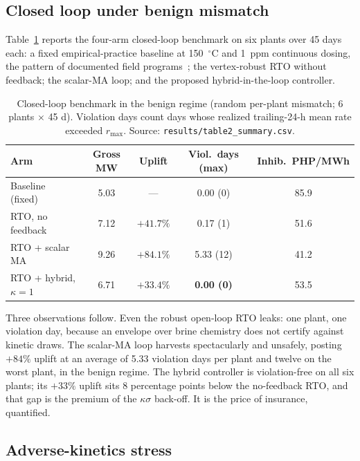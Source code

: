 \subsection{Closed loop under benign mismatch}\label{sec:table2}

Table~\ref{tab:control} reports the four-arm closed-loop benchmark on
six plants over 45 days each: a fixed empirical-practice baseline at
150~$^{\circ}$C and 1~ppm continuous dosing, the pattern of documented
field programs~\citep{baltazar2014grc}; the vertex-robust RTO without
feedback; the scalar-MA loop; and the proposed hybrid-in-the-loop
controller.
\begin{table}[t]\centering
\caption{Closed-loop benchmark in the benign regime (random per-plant
mismatch; 6 plants $\times$ 45 d). Violation days count days whose
realized trailing-24-h mean rate exceeded $r_{\max}$.
Source: \texttt{results/table2\_summary.csv}.}
\label{tab:control}
\begin{tabular}{lcccc}
\toprule
Arm & Gross MW & Uplift & Viol.\ days (max) & Inhib.\ PHP/MWh \\
\midrule
Baseline (fixed) & 5.03 & --- & 0.00 (0) & 85.9 \\
RTO, no feedback & 7.12 & $+41.7\%$ & 0.17 (1) & 51.6 \\
RTO + scalar MA & 9.26 & $+84.1\%$ & 5.33 (12) & 41.2 \\
RTO + hybrid, $\kappa{=}1$ & 6.71 & $+33.4\%$ & \textbf{0.00 (0)} & 53.5 \\
\bottomrule
\end{tabular}
\end{table}
Three observations follow. Even the robust open-loop RTO leaks: one
plant, one violation day, because an envelope over brine chemistry does
not certify against kinetic draws. The scalar-MA loop harvests
spectacularly and unsafely, posting $+84\%$ uplift at an average of
5.33 violation days per plant and twelve on the worst plant, in the
benign regime. The hybrid controller is violation-free on all six
plants; its $+33\%$ uplift sits 8 percentage points below the
no-feedback RTO, and that gap is the premium of the $\kappa\sigma$
back-off. It is the price of insurance, quantified.

\subsection{Adverse-kinetics stress}\label{sec:stress}

